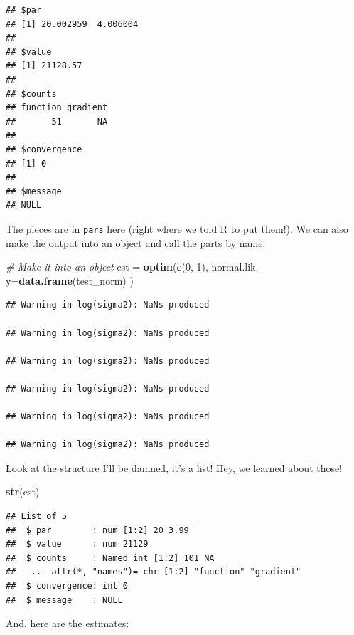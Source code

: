 \documentclass[
]{book}
\newenvironment{Shaded}{\begin{snugshade}}{\end{snugshade}}
\newcommand{\CommentTok}[1]{\textcolor[rgb]{0.56,0.35,0.01}{\textit{#1}}}
\newcommand{\DataTypeTok}[1]{\textcolor[rgb]{0.13,0.29,0.53}{#1}}
\newcommand{\DecValTok}[1]{\textcolor[rgb]{0.00,0.00,0.81}{#1}}
\newcommand{\KeywordTok}[1]{\textcolor[rgb]{0.13,0.29,0.53}{\textbf{#1}}}
\newcommand{\NormalTok}[1]{#1}
\newcommand{\OperatorTok}[1]{\textcolor[rgb]{0.81,0.36,0.00}{\textbf{#1}}}
\newcommand{\StringTok}[1]{\textcolor[rgb]{0.31,0.60,0.02}{#1}}
\begin{document}
\begin{verbatim}
## $par
## [1] 20.002959  4.006004
## 
## $value
## [1] 21128.57
## 
## $counts
## function gradient 
##       51       NA 
## 
## $convergence
## [1] 0
## 
## $message
## NULL
\end{verbatim}

The pieces are in \texttt{pars} here (right where we told R to put them!). We can also make the output into an object and call the parts by name:

\begin{Shaded}
\begin{Highlighting}[]
\CommentTok{# Make it into an object}
\NormalTok{est =}\StringTok{ }\KeywordTok{optim}\NormalTok{(}\KeywordTok{c}\NormalTok{(}\DecValTok{0}\NormalTok{, }\DecValTok{1}\NormalTok{),}
\NormalTok{            normal.lik,}
            \DataTypeTok{y=}\KeywordTok{data.frame}\NormalTok{(test_norm)}
\NormalTok{            ) }
\end{Highlighting}
\end{Shaded}

\begin{verbatim}
## Warning in log(sigma2): NaNs produced

## Warning in log(sigma2): NaNs produced

## Warning in log(sigma2): NaNs produced

## Warning in log(sigma2): NaNs produced

## Warning in log(sigma2): NaNs produced

## Warning in log(sigma2): NaNs produced
\end{verbatim}

Look at the structure I'll be damned, it's a list! Hey, we learned about those!

\begin{Shaded}
\begin{Highlighting}[]
\KeywordTok{str}\NormalTok{(est)   }
\end{Highlighting}
\end{Shaded}

\begin{verbatim}
## List of 5
##  $ par        : num [1:2] 20 3.99
##  $ value      : num 21129
##  $ counts     : Named int [1:2] 101 NA
##   ..- attr(*, "names")= chr [1:2] "function" "gradient"
##  $ convergence: int 0
##  $ message    : NULL
\end{verbatim}

And, here are the estimates:

\begin{Shaded}
\end{Shaded}
\end{document}
